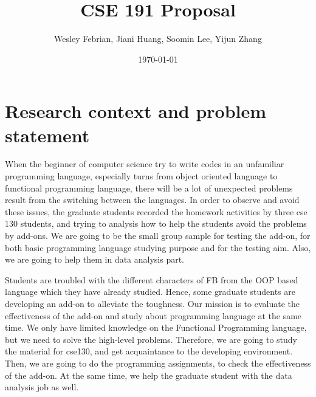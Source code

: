 \documentclass[dvips,12pt]{article}
\begin{document}

\title{\textbf{CSE 191 Proposal}}
\author{Wesley Febrian, Jiani Huang, Soomin Lee, Yijun Zhang}
\date{\today}



\maketitle


\section{Research context and problem statement}

When the beginner of computer science try to write codes in an unfamiliar programming language, especially turns from object oriented language to functional programming language, there will be a lot of unexpected problems result from the switching between the languages. In order to observe and avoid these issues, the graduate students recorded the homework  activities by three cse 130 students, and trying to analysis how to help the students avoid the problems by add-ons. We are going to be the small group sample for testing the add-on, for both basic programming language studying purpose and for the testing aim. Also, we are going to help them in data analysis part.


Students are troubled with the different characters of FB from the OOP based language which they have already studied. Hence, some graduate students are developing an add-on to alleviate the toughness. Our mission is to evaluate the effectiveness of the add-on and study about programming language at the same time. We only have limited knowledge on the Functional Programming language, but we need to solve the high-level problems. Therefore, we are going to study the material for cse130, and get acquaintance to the developing environment. Then, we are going to do the programming assignments, to check the effectiveness of the add-on. At the same time, we help the graduate student with the data analysis job as well.
\end{document}
